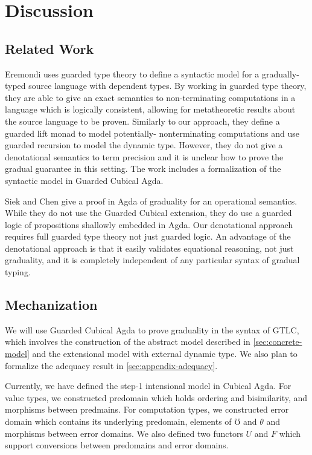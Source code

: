 \section{Discussion}

\subsection{Related Work}
Eremondi \cite{Eremondi_2023} uses guarded type theory to
define a syntactic model for a gradually-typed source
language with dependent types. By working in guarded type theory, they are
able to give an exact semantics to non-terminating computations in a language
which is logically consistent, allowing for metatheoretic results about the
source language to be proven.
%
Similarly to our approach, they define a guarded lift monad to model potentially-
nonterminating computations and use guarded recursion to model the dynamic type.
However, they do not give a denotational semantics to term precision and it is unclear
how to prove the gradual guarantee in this setting.
The work includes a formalization of the syntactic model in Guarded Cubical Agda.

Siek and Chen \cite{siekchen2021} give a proof in Agda of graduality
for an operational semantics. While they do not use the Guarded
Cubical extension, they do use a guarded logic of propositions
shallowly embedded in Agda. Our denotational approach requires full
guarded type theory not just guarded logic. An advantage of the
denotational approach is that it easily validates equational
reasoning, not just graduality, and it is completely independent of
any particular syntax of gradual typing.

\subsection{Mechanization}
We will use Guarded Cubical Agda to prove graduality in the syntax of 
GTLC, which involves the construction of the abstract model described in 
\ref{sec:concrete-model} and the extensional model with external dynamic 
type. We also plan to formalize the adequacy result in \ref{sec:appendix-adequacy}.

Currently, we have defined the step-1 intensional model in Cubical 
Agda. For value types, we constructed predomain which holds ordering and 
bisimilarity, and morphisms between predmains. For computation types, we 
constructed error domain which contains its underlying predomain, 
elements of $\mho$ and $\theta$ and morphisms between error domains. We 
also defined two functors $U$ and $F$ which support conversions between 
predomains and error domains.

